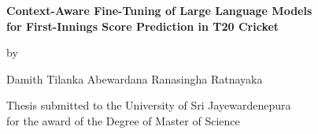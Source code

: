 \clearpage
\thispagestyle{empty}

\begin{center}

\vspace*{2cm}

{\fontsize{24}{30}\selectfont\bfseries
Context-Aware Fine-Tuning of Large Language Models\\[0.4em]
for First-Innings Score Prediction in T20 Cricket\par}

\vspace{2.5cm}

{\large by}

\vspace{2cm}

{\fontsize{18}{24}\selectfont Damith Tilanka Abewardana Ranasingha Ratnayaka\par}

\end{center}

\vfill

\begin{center}
{\fontsize{16}{24}\selectfont
Thesis submitted to the University of Sri Jayewardenepura\\
for the award of the Degree of Master of Science\par}
\end{center}

\clearpage
